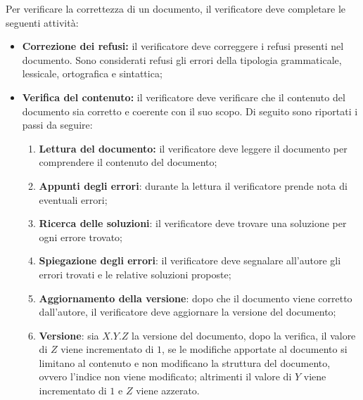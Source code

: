 Per verificare la correttezza di un documento, il verificatore deve
completare le seguenti attività:
\begin{itemize}
	\item \textbf{Correzione dei refusi:} il verificatore deve correggere i
	      refusi presenti nel documento. Sono considerati refusi gli errori
	      della tipologia grammaticale, lessicale, ortografica e sintattica;

	\item \textbf{Verifica del contenuto:} il verificatore deve verificare
	      che il contenuto del documento sia corretto e coerente con il suo
	      scopo. Di seguito sono riportati i passi da seguire:
	      \begin{enumerate}
		      \item \textbf{Lettura del documento:} il verificatore deve
		            leggere il documento per comprendere il contenuto del
		            documento;

		      \item \textbf{Appunti degli errori}: durante la lettura il
		            verificatore prende nota di eventuali errori;

		      \item \textbf{Ricerca delle soluzioni}: il verificatore deve
		            trovare una soluzione per ogni errore trovato;

		      \item \textbf{Spiegazione degli errori}: il verificatore deve
		            segnalare all'autore gli errori trovati e le relative 
					soluzioni proposte;

		      \item \textbf{Aggiornamento della versione}: dopo che il documento
		            viene corretto dall'autore, il verificatore deve aggiornare
		            la versione del documento;

		      \item \textbf{Versione}: sia $X.Y.Z$ la versione del documento,
		            dopo la verifica, il valore di $Z$ viene incrementato di
		            $1$, se le modifiche apportate al documento si limitano al
		            contenuto e non modificano la struttura del documento,
		            ovvero l'indice non viene modificato; altrimenti il valore
		            di $Y$ viene incrementato di $1$ e $Z$ viene azzerato.
	      \end{enumerate}
\end{itemize}
